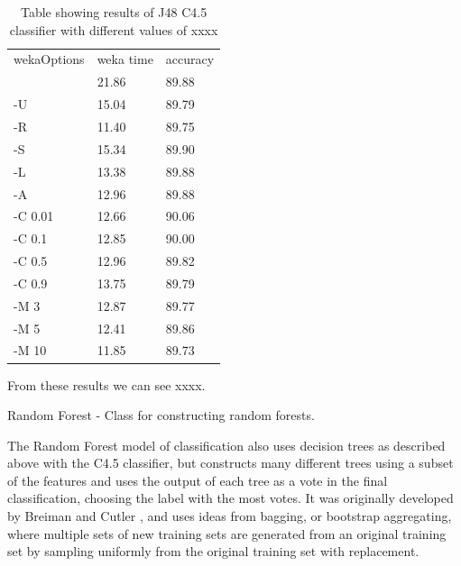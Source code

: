 \documentclass[12pt,oneside]{book}
\begin{document}
\begin{table}
\begin{tabular}{|l|l|l|}
\hline

wekaOptions          & weka time       &accuracy        \\
                     & 21.86           & 89.88           \\
-U                   & 15.04           & 89.79           \\
-R                   & 11.40           & 89.75           \\
-S                   & 15.34           & 89.90           \\
-L                   & 13.38           & 89.88           \\
-A                   & 12.96           & 89.88           \\
-C 0.01              & 12.66           & 90.06           \\
-C 0.1               & 12.85           & 90.00           \\
-C 0.5               & 12.96           & 89.82           \\
-C 0.9               & 13.75           & 89.79           \\
-M 3                 & 12.87           & 89.77           \\
-M 5                 & 12.41           & 89.86           \\
-M 10                & 11.85           & 89.73           \\



\hline
\end{tabular}
\caption{Table showing results of J48 C4.5 classifier with
  different values of xxxx}
\label{table:obv-12-j48}
\end{table}

From these results we can see xxxx.


%
%

Random Forest - Class for constructing random forests. 

The Random Forest model of classification also uses decision trees as
described above with the C4.5 classifier, but constructs many
different trees using a subset of the features and uses the output of
each tree as a vote in the final classification, choosing the label
with the most votes.  It was originally developed by Breiman and
Cutler \cite{breiman2001}, and uses ideas from bagging, or bootstrap
aggregating, where multiple sets of new training sets are generated
from an original training set by sampling uniformly from the original
training set with replacement.
\end{document}
